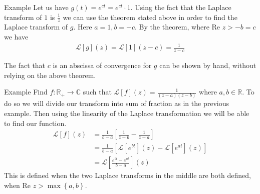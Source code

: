 \begin{parag}{Example}
    Let us have $g\left(t\right) = e^{ct}= e^{ct} \cdot  1$. Using the fact that the Laplace transform of $1$ is $\frac{1}{z}$ we can use the theorem stated above in order to find the Laplace transform of $g$. Here $a = 1, b =  -c$. By the theorem, where $\text{Re }z > -b = c$ we have 
	\begin{align*} 
		\mathcal{L}\left[g\right]\left(z\right) =  \mathcal{L}\left[1\right]\left(z - c\right) = \frac{1}{z - c}
	\end{align*}

\end{parag}



\begin{framedremark}
The fact that $c$ is an abscissa of convergence for $g$ can be shown by hand, without relying on the above theorem.
\end{framedremark}



\begin{parag}{Example}
	Find $f : \mathbb{R}_+ \to \mathbb{C}$ such that $\mathcal{L}\left[f\right]\left(z\right) = \frac{1}{\left(z - a\right)\left(z - b\right)}$ where $a, b \in \mathbb{R}$. To do so we will divide our transform into sum of fraction as in the previous example. Then using the linearity of the Laplace transformation we will be able to find our function.
	\begin{align*} 
		\mathcal{L}\left[f\right]\left(z\right) &= \frac{1}{b-a} \left[\frac{1}{z-b} - \frac{1}{z-a}\right]\\
												&=	\frac{1}{b-a}\left[\mathcal{L}\left[e^{bt}\right]\left(z\right) - \mathcal{L}\left[e^{at}\right]\left(z\right)\right]\\
												&= \mathcal{L}\left[\frac{e^{bt} - e^{at}}{b-a}\right]\left(z\right)
	\end{align*}
	This is defined when the two Laplace transforms in the middle are both defined, when $\text{Re }z > \max \left\{a, b\right\}$.
\end{parag}




